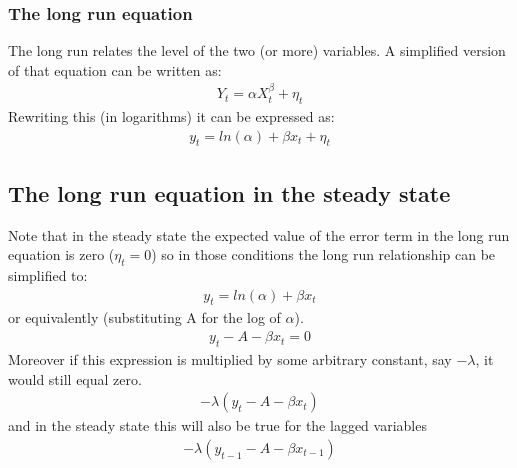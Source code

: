 \documentclass[letterpaper,10pt,english]{jupyterBook}
\begin{document}
\subsubsection{The long run equation}
\label{\detokenize{content/05_WBModels/LoadingWBModel:the-long-run-equation}}
\sphinxAtStartPar
The long run relates the level of the two (or more) variables.  A simplified version of that equation can be written as:
\begin{equation*}
\begin{split}Y_t=αX_t^β+ \eta_t\end{split}
\end{equation*}
\sphinxAtStartPar
Rewriting this (in logarithms) it can be expressed as:
\begin{equation*}
\begin{split}y_t = ln⁡(α) + βx_t + \eta_t\end{split}
\end{equation*}

\subsection{The long run equation in the steady state}
\label{\detokenize{content/05_WBModels/LoadingWBModel:the-long-run-equation-in-the-steady-state}}
\sphinxAtStartPar
Note that in the steady state the expected value of the error term in the long run equation is zero (\(\eta_t=0 \)) so in those conditions the long run relationship can be simplified to:
\begin{equation*}
\begin{split}y_t=ln⁡(α)+\beta x_t\end{split}
\end{equation*}
\sphinxAtStartPar
or equivalently (substituting A for the log of \(\alpha\)).
\begin{equation*}
\begin{split}y_t-A-βx_t=0\end{split}
\end{equation*}
\sphinxAtStartPar
Moreover if this expression is multiplied by some arbitrary constant, say \(-\lambda\), it would still equal zero.
\begin{equation*}
\begin{split}-\lambda(y_t -A-βx_t)\end{split}
\end{equation*}
\sphinxAtStartPar
and in the steady state this will also be true for the lagged variables
\begin{equation*}
\begin{split}-\lambda(y_{t-1}- A - βx_{t-1})\end{split}
\end{equation*}
\end{document}
